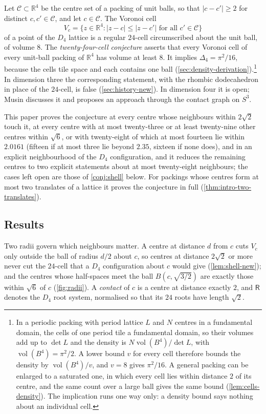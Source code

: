 \documentclass[11pt,reqno]{amsart}
\renewcommand{\_}{\origunderscore\allowbreak}
\numberwithin{equation}{section}
\theoremstyle{plain}
\theoremstyle{definition}
\theoremstyle{remark}
\newcommand{\Rt}{\mathsf{R}}                 %
\DeclareMathOperator{\vol}{vol}
\begin{document}
Let $\mathcal{C}\subset\mathbb{R}^4$ be the centre set of a packing of
unit balls, so that $|c-c'|\ge2$ for distinct $c,c'\in\mathcal{C}$, and
let $c\in\mathcal{C}$. The Voronoi cell
\[
  V_c=\bigl\{z\in\mathbb{R}^4 : |z-c|\le|z-c'| \text{ for all } c'\in\mathcal{C}\bigr\}
\]
of a point of the $D_4$ lattice is a regular $24$-cell circumscribed about
the unit ball, of volume $8$. The \emph{twenty-four-cell conjecture}
asserts that every Voronoi cell of every unit-ball packing of
$\mathbb{R}^4$ has volume at least $8$. It implies $\Delta_4=\pi^2/16$,
because the cells tile space and each contains one ball
(\cref{sec:density-derivation}).\footnote{In a periodic packing with
  period lattice $L$ and $N$ centres in a fundamental domain, the cells of
  one period tile a fundamental domain, so their volumes add up to $\det L$
  and the density is $N\vol(B^4)/\det L$, with $\vol(B^4)=\pi^2/2$. A lower
  bound $v$ for every cell therefore bounds the density by $\vol(B^4)/v$,
  and $v=8$ gives $\pi^2/16$. A general packing can be enlarged to a
  saturated one, in which every cell lies within distance $2$ of its centre,
  and the same count over a large ball gives the same bound
  (\cref{lem:cells-density}). The implication runs one way only: a density
  bound says nothing about an individual cell.} In dimension three the
corresponding statement, with the rhombic dodecahedron in place of the
$24$-cell, is false (\cref{sec:history-new}). In dimension four it is
open; Musin \cite{Mus18} discusses it and proposes an approach through the
contact graph on $S^3$.

This paper proves the conjecture at every centre whose neighbours within
$2\sqrt2$ touch it, at every centre with at most twenty-three or at least
twenty-nine other centres within $\sqrt6$, or with twenty-eight of which at
most fourteen lie within $2.0161$ (fifteen if at most three lie beyond
$2.35$, sixteen if none does), and in an explicit neighbourhood
of the $D_4$ configuration, and it reduces the remaining centres to two
explicit statements about at most twenty-eight neighbours; the cases left open
are those of \cref{conj:shell} below. For packings whose centres form at most two translates of a lattice
it proves the conjecture in full (\cref{thm:intro-two-translates}).

\subsection{Results}\label{sec:results}

Two radii govern which neighbours matter. A centre at distance $d$ from
$c$ cuts $V_c$ only outside the ball of radius $d/2$ about $c$, so centres
at distance $2\sqrt2$ or more never cut the $24$-cell that a $D_4$
configuration about $c$ would give (\cref{lem:shell-new}); and the centres
whose half-spaces meet the ball $B(c,\sqrt{3/2})$ are exactly those within
$\sqrt6$ of $c$ (\cref{fig:radii}). A \emph{contact} of $c$ is a centre at
distance exactly $2$, and $\Rt$ denotes the $D_4$ root system, normalised so that its
$24$ roots have length $\sqrt2$.
\end{document}
